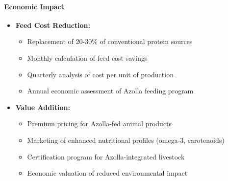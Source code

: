 \paragraph{Economic Impact}
\begin{itemize}
    \item \textbf{Feed Cost Reduction:}
    \begin{itemize}
        \item Replacement of 20-30\% of conventional protein sources
        \item Monthly calculation of feed cost savings
        \item Quarterly analysis of cost per unit of production
        \item Annual economic assessment of Azolla feeding program
    \end{itemize}
    \item \textbf{Value Addition:}
    \begin{itemize}
        \item Premium pricing for Azolla-fed animal products
        \item Marketing of enhanced nutritional profiles (omega-3, carotenoids)
        \item Certification program for Azolla-integrated livestock
        \item Economic valuation of reduced environmental impact
    \end{itemize}
\end{itemize}

